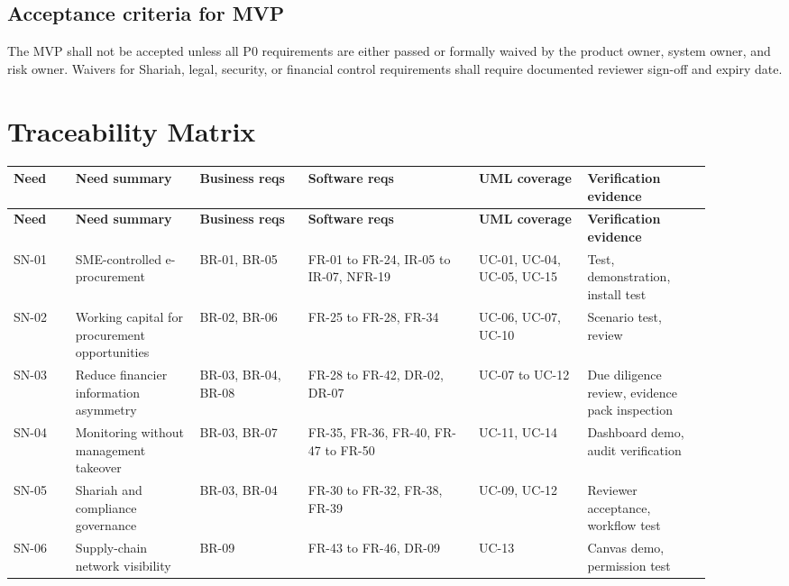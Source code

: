 \documentclass[11pt,a4paper]{article}
\begin{document}
\subsection{Acceptance criteria for MVP}
The MVP shall not be accepted unless all P0 requirements are either passed or formally waived by the product owner, system owner, and risk owner. Waivers for Shariah, legal, security, or financial control requirements shall require documented reviewer sign-off and expiry date.

\section{Traceability Matrix}
\begin{landscape}
\begin{footnotesize}
\begin{longtable}{@{}p{0.08\linewidth}p{0.16\linewidth}p{0.14\linewidth}p{0.22\linewidth}p{0.14\linewidth}p{0.16\linewidth}@{}}
\rowcolor{gray!18}\textbf{Need} & \textbf{Need summary} & \textbf{Business reqs} & \textbf{Software reqs} & \textbf{UML coverage} & \textbf{Verification evidence} \\ \hline
\endfirsthead
\rowcolor{gray!18}\textbf{Need} & \textbf{Need summary} & \textbf{Business reqs} & \textbf{Software reqs} & \textbf{UML coverage} & \textbf{Verification evidence} \\ \hline
\endhead
SN-01 & SME-controlled e-procurement & BR-01, BR-05 & FR-01 to FR-24, IR-05 to IR-07, NFR-19 & UC-01, UC-04, UC-05, UC-15 & Test, demonstration, install test \\ \hline
SN-02 & Working capital for procurement opportunities & BR-02, BR-06 & FR-25 to FR-28, FR-34 & UC-06, UC-07, UC-10 & Scenario test, review \\ \hline
SN-03 & Reduce financier information asymmetry & BR-03, BR-04, BR-08 & FR-28 to FR-42, DR-02, DR-07 & UC-07 to UC-12 & Due diligence review, evidence pack inspection \\ \hline
SN-04 & Monitoring without management takeover & BR-03, BR-07 & FR-35, FR-36, FR-40, FR-47 to FR-50 & UC-11, UC-14 & Dashboard demo, audit verification \\ \hline
SN-05 & Shariah and compliance governance & BR-03, BR-04 & FR-30 to FR-32, FR-38, FR-39 & UC-09, UC-12 & Reviewer acceptance, workflow test \\ \hline
SN-06 & Supply-chain network visibility & BR-09 & FR-43 to FR-46, DR-09 & UC-13 & Canvas demo, permission test \\ \hline

\end{longtable}
\end{footnotesize}
\end{landscape}
\end{document}
